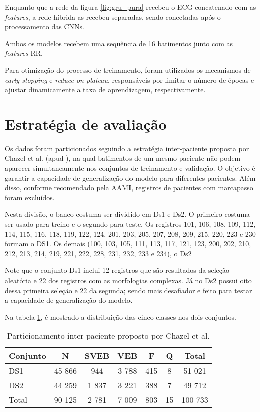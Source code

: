 Enquanto que a rede da figura \ref{fig:gru_pura} recebeu o ECG concatenado com as \textit{features}, a rede híbrida as recebeu separadas, sendo conectadas após o processamento
das CNNs.

Ambos os modelos recebem uma sequência de 16 batimentos junto com as \textit{features} RR.

Para otimização do processo de treinamento, foram utilizados os mecanismos de \textit{early stopping} e \textit{reduce on plateau}, responsáveis por limitar o número de épocas e ajustar dinamicamente a taxa de aprendizagem, respectivamente.

\section{Estratégia de avaliação}

Os dados foram particionados seguindo a estratégia inter-paciente proposta por Chazel et al. (apud ), na qual batimentos de um mesmo paciente não podem aparecer simultaneamente nos conjuntos de treinamento e validação. 
O objetivo é garantir a capacidade de generalização do modelo para diferentes pacientes. 
Além disso, conforme recomendado pela AAMI, registros de pacientes com marcapasso foram excluídos.

Nesta divisão, o banco costuma ser dividido em Ds1 e Ds2. O primeiro costuma ser usado para treino e o segundo para teste.
Os registros 101, 106, 108, 109, 112, 114, 115, 116, 118, 119, 122, 124, 201, 203, 205, 207, 208, 209, 215, 220, 223 e 230 formam o DS1. Os demais (100, 103, 105, 111, 113, 117, 121, 123, 200, 202, 210, 212, 213, 214, 219, 221, 222, 228, 231, 232, 233 e 234), o Ds2

Note que o conjunto Ds1 inclui 12 registros que são resultados da seleção aleatória e 22 dos registros com as morfologias complexas. Já no Ds2 possui 
oito dessa primeira seleção e 22 da segunda; sendo mais desafiador e feito para testar a capacidade de generalização do modelo.

Na tabela \ref{tab:particionamento}, é mostrado a distribuição das cinco classes nos dois conjuntos.

\begin{table}[htb]
\centering
\caption{Particionamento inter-paciente proposto por Chazel et al.}
\label{tab:particionamento}
\begin{tabular}{|l|c|c|c|c|c|c|}
\hline
Conjunto & N & SVEB & VEB & F & Q & Total \\ \hline
DS1 & 45 866 & 944 & 3 788 & 415 & 8 & 51 021 \\ \hline
DS2 & 44 259 & 1 837 & 3 221 & 388 & 7 & 49 712 \\ \hline
Total & 90 125 & 2 781 & 7 009 & 803 & 15 & 100 733 \\ \hline
\end{tabular}
\end{table}

